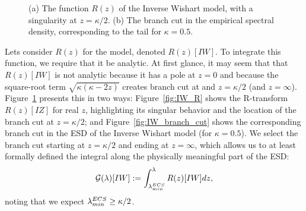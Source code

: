 \begin{figure}[t]
    \centering
    \caption{(a) The function $R(z)$ of the Inverse Wishart model, with a singularity at $z = \kappa/2$. (b) The branch cut in the empirical spectral density, corresponding to the tail for $\kappa = 0.5$.}
    \label{fig:R_branch_cut_combined}
\end{figure}

Lets consider $R(z)$ for the \InverseWishart model, denoted $R(z)[IW]$.
To integrate this function, we require that it be analytic.
At first glance, it may seem that that $R(z)[IW]$ is not analytic because it
has a pole at $z=0$ and because the square-root term $\sqrt{\kappa(\kappa-2z)}$  creates branch
cut at and $z=\kappa/2$ (and $z=\infty$).
Figure~\ref{fig:R_branch_cut_combined} presents this in two ways:
Figure~\ref{fig:IW_R} shows the R-transform $R(z)[IZ]$ for real $z$, highlighting its singular behavior and the location of the branch cut at $z = \kappa/2$; and
Figure~\ref{fig:IW_branch_cut} shows the corresponding branch cut in the ESD of the Inverse Wishart model (for $\kappa = 0.5$).
We select the branch cut starting at $z=\kappa/2$ and ending at $z=\infty$,
which allows us to at least formally defined the integral along the physically meaningful part of the ESD:
\begin{equation}
\label{eqn:IW_model_1} 
\mathcal{G(\lambda)}[IW] := \int_{\lambda^{ECS}_{min}}^{\lambda} R(z)[IW] dz  ,
\end{equation}
noting that we expect $\lambda^{ECS}_{min}\ge\kappa/2$.

